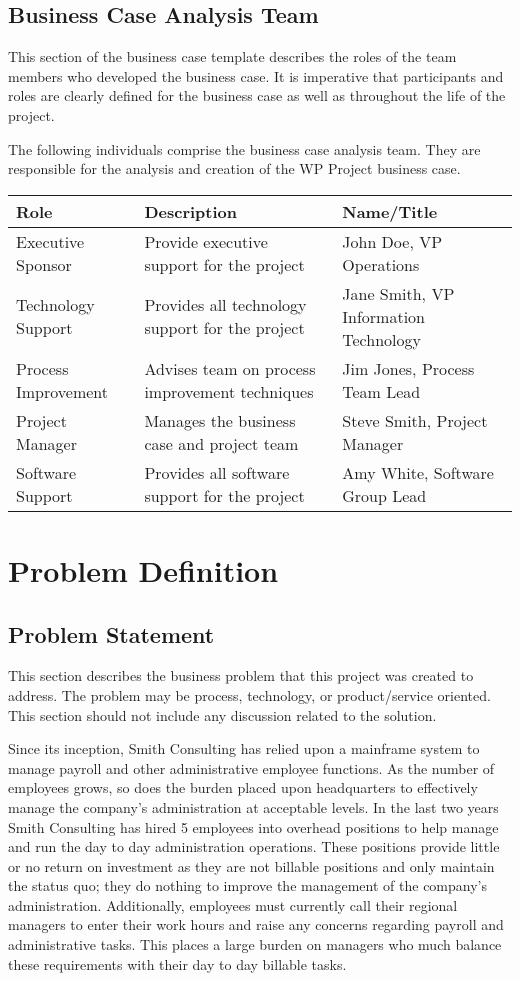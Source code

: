 \documentclass[11pt]{article}
\begin{document}
\subsection{Business Case Analysis Team}
\label{sec:org921b3a9}
This section of the business case template describes the roles of the team members who developed the business case. It is imperative that participants and roles are clearly defined for the business case as well as throughout the life of the project.

The following individuals comprise the business case analysis team. They are responsible for the analysis and creation of the WP Project business case.

\begin{center}
\begin{tabular}{lll}
Role & Description & Name/Title\\
\hline
Executive Sponsor & Provide executive support for the project & John Doe, VP Operations\\
Technology Support & Provides all technology support for the project & Jane Smith, VP Information Technology\\
Process Improvement & Advises team on process improvement techniques & Jim Jones, Process Team Lead\\
Project Manager & Manages the business case and project team & Steve Smith, Project Manager\\
Software Support & Provides all software support for the project & Amy White, Software Group Lead\\
\end{tabular}
\end{center}

\section{Problem Definition}
\label{sec:orgd3722c1}
\subsection{Problem Statement}
\label{sec:orge727a9c}
This section describes the business problem that this project was created to address. The problem may be process, technology, or product/service oriented. This section should not include any discussion related to the solution.

Since its inception, Smith Consulting has relied upon a mainframe system to manage payroll and other administrative employee functions. As the number of employees grows, so does the burden placed upon headquarters to effectively manage the company’s administration at acceptable levels. In the last two years Smith Consulting has hired 5 employees into overhead positions to help manage and run the day to day administration operations. These positions provide little or no return on investment as they are not billable positions and only maintain the status quo; they do nothing to improve the management of the company’s administration. Additionally, employees must currently call their regional managers to enter their work hours and raise any concerns regarding payroll and administrative tasks. This places a large burden on managers who much balance these requirements with their day to day billable tasks.
\end{document}
